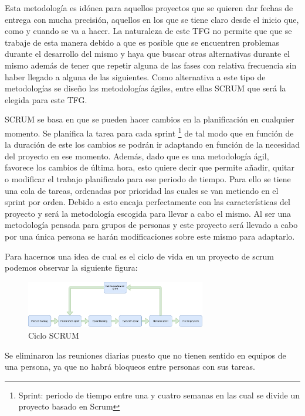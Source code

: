 \documentclass[11pt,a4paper,twoside,final]{article}
\begin{document}
Esta metodología es idónea para aquellos proyectos que se quieren dar fechas de entrega con mucha precisión, aquellos en los que se tiene claro desde el inicio que, como y cuando se va a hacer. La naturaleza de este TFG no permite que que se trabaje de esta manera debido a que es posible que se encuentren problemas durante el desarrollo del mismo y haya que buscar otras alternativas durante el mismo además de tener que repetir alguna de las fases con relativa frecuencia sin haber llegado a alguna de las siguientes. Como alternativa a este tipo de metodologías se diseño las metodologías ágiles, entre ellas SCRUM \cite{scrum} que será la elegida para este TFG.

SCRUM se basa en que se pueden hacer cambios en la planificación en cualquier momento. Se planifica la tarea para cada sprint \footnote{Sprint: periodo de tiempo entre una y cuatro semanas en las cual se divide un proyecto basado en Scrum} de tal modo que en función de la duración de este los cambios se podrán ir adaptando en función de la necesidad del proyecto en ese momento. Además, dado que es una metodología ágil, favorece los cambios de última hora, esto quiere decir que permite añadir, quitar o modificar el trabajo planificado para ese periodo de tiempo. Para ello se tiene una cola de tareas, ordenadas por prioridad las cuales se van metiendo en el sprint por orden. Debido a esto encaja perfectamente con las características del proyecto y será la metodología escogida para llevar a cabo el mismo. Al ser una metodología pensada para grupos de personas y este proyecto será llevado a cabo por una única persona se harán modificaciones sobre este mismo para adaptarlo.

Para hacernos una idea de cual es el ciclo de vida en un proyecto de scrum podemos observar la siguiente figura:

\begin{figure}[H]
  \centering
   \includegraphics[width=0.7\textwidth]{Scrum.pdf}
  \caption{Ciclo SCRUM}
  \label{Ciclo SCRUM}
\end{figure}

Se eliminaron las reuniones diarias puesto que no tienen sentido en equipos de una persona, ya que no habrá bloqueos entre personas con sus tareas.
\end{document}
